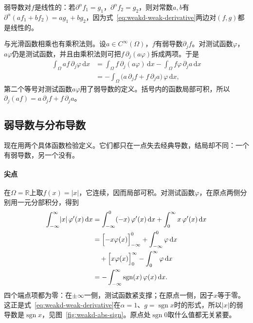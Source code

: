 弱导数对$f$是线性的：若$\partial^\alpha f_1=g_1$，$\partial^\alpha f_2=g_2$，则对常数$a,b$有$\partial^\alpha(af_1+bf_2)=ag_1+bg_2$，因为式~\eqref{eq:weakd-weak-derivative}两边对$(f,g)$都是线性的。

与光滑函数相乘也有乘积法则。设$a\in C^\infty(\Omega)$，$f$有弱导数$\partial_jf$。对测试函数$\varphi$，$a\varphi$仍是测试函数，并且由乘积法则可把$f\,\partial_j(a\varphi)$拆成两项。于是
\[
\begin{aligned}
\int_\Omega af\,\partial_j\varphi\,\mathrm dx
&=\int_\Omega f\,\partial_j(a\varphi)\,\mathrm dx-\int_\Omega f\varphi\,\partial_ja\,\mathrm dx\\
&=-\int_\Omega\bigl(a\,\partial_jf+f\,\partial_ja\bigr)\,\varphi\,\mathrm dx ,
\end{aligned}
\]
第二个等号对测试函数$a\varphi$用了弱导数的定义。括号内的函数局部可积，所以$\partial_j(af)=a\,\partial_jf+f\,\partial_ja$。

\subsection{弱导数与分布导数}
\label{sec:weakd-distributional-derivative}

现在用两个具体函数检验定义。它们都只在一点失去经典导数，结局却不同：一个有弱导数，另一个没有。

\paragraph{尖点}
在$\Omega=\mathbb R$上取$f(x)=\lvert x\rvert$，它连续，因而局部可积。对测试函数$\varphi$，在原点两侧分别用一元分部积分，得到
\[
\begin{aligned}
\int_{-\infty}^{\infty}\lvert x\rvert\,\varphi'(x)\,\mathrm dx
&=\int_{-\infty}^{0}(-x)\,\varphi'(x)\,\mathrm dx+\int_{0}^{\infty}x\,\varphi'(x)\,\mathrm dx\\
&=\Bigl[-x\varphi(x)\Bigr]_{-\infty}^{0}+\int_{-\infty}^{0}\varphi\,\mathrm dx\\
&\quad+\Bigl[x\varphi(x)\Bigr]_{0}^{\infty}-\int_{0}^{\infty}\varphi\,\mathrm dx\\
&=-\int_{-\infty}^{\infty}\operatorname{sgn}(x)\,\varphi(x)\,\mathrm dx .
\end{aligned}
\]
四个端点项都为零：在$\pm\infty$一侧，测试函数紧支撑；在原点一侧，因子$x$等于零。这正是式~\eqref{eq:weakd-weak-derivative}在$\alpha=1$、$g=\operatorname{sgn}x$时的形式，所以$\lvert x\rvert$的弱导数是$\operatorname{sgn}x$，见图~\ref{fig:weakd-abs-sign}。原点处$\operatorname{sgn}0$取什么值都无关紧要。

